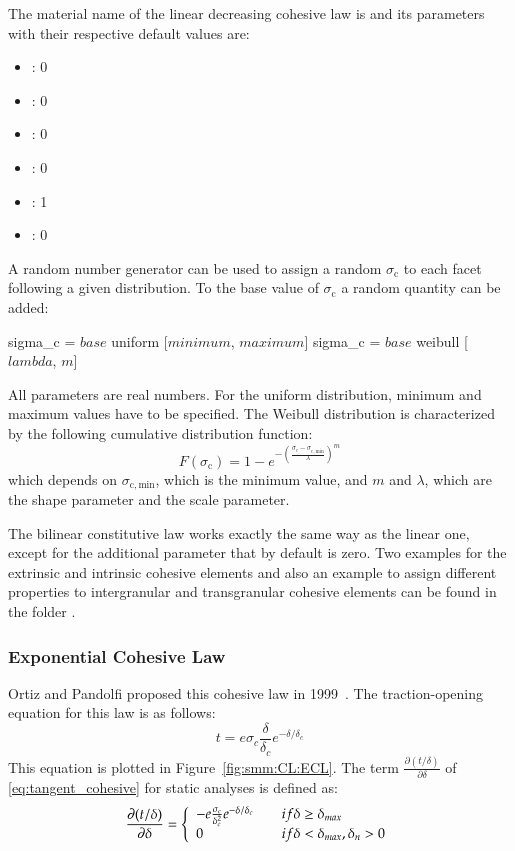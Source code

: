 The material name of the linear decreasing cohesive law  is
 and its parameters with their
respective default values are:
\begin{itemize}
\item {}: 0
\item {}: 0
\item {}: 0
\item {}: 0
\item {}: 1
\item {}: 0
\end{itemize}
A random number generator can be used to assign a random
$\sigma_\mathrm{c}$ to each facet following a given distribution. To
the base value of $\sigma_\mathrm{c}$ a random quantity can be added:
\begin{cpp}
  sigma_c = $base$ uniform [$minimum$, $maximum$]
  sigma_c = $base$ weibull [$lambda$, $m$]
\end{cpp}
All parameters are real numbers. For the uniform distribution, minimum
and maximum values have to be specified. The Weibull distribution is
characterized by the following cumulative distribution function:
\begin{equation}
    F(\sigma_\mathrm{c}) = 1- e^{-\left(
      \frac{\sigma_c-\sigma_\mathrm{c, min}}{\lambda} \right)^m}
\end{equation}
which depends on $\sigma_\mathrm{c, min}$, which is the minimum value,
and $m$ and $\lambda$, which are the shape parameter and the scale
parameter.

The bilinear constitutive law works exactly the same way as the linear
one, except for the additional parameter  that by
default is zero. Two examples for the extrinsic and intrinsic cohesive
elements and also an example to assign different properties to
intergranular and transgranular cohesive elements can be found in
the folder .

\subsubsection{Exponential Cohesive Law}

Ortiz and Pandolfi proposed this cohesive law in 1999~\cite{ortiz1999}.  The
traction-opening equation for this law is as follows:
\begin{equation}
  \label{eq:exponential_law}
  t = e \sigma_c \frac{\delta}{\delta_c}e^{-\delta/ \delta_c}
\end{equation}
This equation is plotted in Figure~\ref{fig:smm:CL:ECL}. The term
$\frac{\partial{(t/\delta)}}{\partial{\delta}}$ of
\eqref{eq:tangent_cohesive} for static analyses is defined as:
\begin{equation}
  \frac{\partial{(t/ \delta)}}{\partial{\delta}} = \left\{\begin{array} {l l}
      -e  \frac{\sigma_c}{\delta_c^2  }e^{-\delta  /  \delta_c} &  \quad  if
      \delta \geq \delta_{max}\\
      0 & \quad if \delta < \delta_{max}, \delta_n > 0
    \end{array} \right.
\end{equation}


